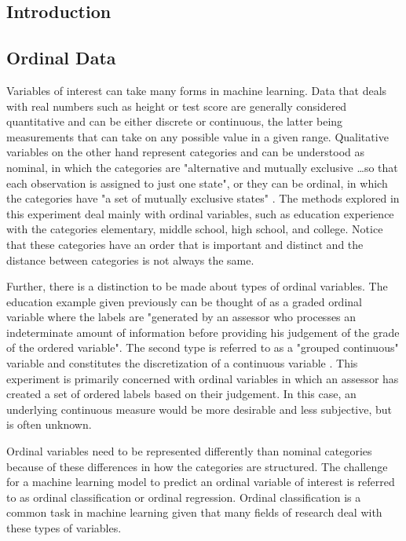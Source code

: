 \documentclass[10pt]{article}\usepackage[]{graphicx}\usepackage[]{xcolor}
\begin{document}


\setcounter{section}{0}

\begin{center}
\section{Introduction}
\end{center}
\subsection{Ordinal Data}
Variables of interest can take many forms in machine learning. Data that deals with real numbers such as height or test score are generally considered quantitative and can be either discrete or continuous, the latter being measurements that can take on any possible value in a given range. Qualitative variables on the other hand represent categories and can be understood as nominal, in which the categories are "alternative and mutually exclusive \ldots so that each observation is assigned to just one state", or they can be ordinal, in which the categories have "a set of mutually exclusive states" \cite{Quote:Hild}. The methods explored in this experiment deal mainly with ordinal variables, such as education experience with the categories elementary, middle school, high school, and college. Notice that these categories have an order that is important and distinct and the distance between categories is not always the same. 

Further, there is a distinction to be made about types of ordinal variables. The education example given previously can be thought of as a graded ordinal variable where the labels are "generated by an assessor who processes an indeterminate amount of information before providing his judgement of the grade of the ordered variable". The second type is referred to as a "grouped continuous" variable and constitutes the discretization of a continuous variable \cite{Quote:Anderson}. This experiment is primarily concerned with ordinal variables in which an assessor has created a set of ordered labels based on their judgement. In this case, an underlying continuous measure would be more desirable and less subjective, but is often unknown.

Ordinal variables need to be represented differently than nominal categories because of these differences in how the categories are structured. The challenge for a machine learning model to predict an ordinal variable of interest is referred to as ordinal classification or ordinal regression. Ordinal classification is a common task in machine learning given that many fields of research deal with these types of variables. 
\end{document}
